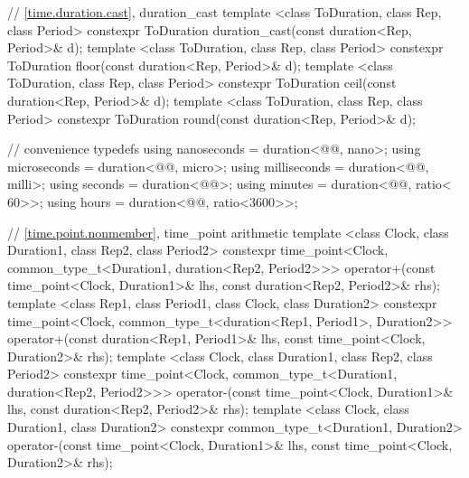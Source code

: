 \begin{codeblock}
{{    // \ref{time.duration.cast}, duration_cast
    template <class ToDuration, class Rep, class Period>
      constexpr ToDuration duration_cast(const duration<Rep, Period>& d);
    template <class ToDuration, class Rep, class Period>
      constexpr ToDuration floor(const duration<Rep, Period>& d);
    template <class ToDuration, class Rep, class Period>
      constexpr ToDuration ceil(const duration<Rep, Period>& d);
    template <class ToDuration, class Rep, class Period>
      constexpr ToDuration round(const duration<Rep, Period>& d);

    // convenience typedefs
    using nanoseconds  = duration<@@, nano>;
    using microseconds = duration<@@, micro>;
    using milliseconds = duration<@@, milli>;
    using seconds      = duration<@@>;
    using minutes      = duration<@@, ratio<  60>>;
    using hours        = duration<@@, ratio<3600>>;

    // \ref{time.point.nonmember}, time_point arithmetic
    template <class Clock, class Duration1, class Rep2, class Period2>
      constexpr time_point<Clock, common_type_t<Duration1, duration<Rep2, Period2>>>
      operator+(const time_point<Clock, Duration1>& lhs,
                const duration<Rep2, Period2>& rhs);
    template <class Rep1, class Period1, class Clock, class Duration2>
      constexpr time_point<Clock, common_type_t<duration<Rep1, Period1>, Duration2>>
      operator+(const duration<Rep1, Period1>& lhs,
                const time_point<Clock, Duration2>& rhs);
    template <class Clock, class Duration1, class Rep2, class Period2>
      constexpr time_point<Clock, common_type_t<Duration1, duration<Rep2, Period2>>>
      operator-(const time_point<Clock, Duration1>& lhs,
                const duration<Rep2, Period2>& rhs);
    template <class Clock, class Duration1, class Duration2>
      constexpr common_type_t<Duration1, Duration2>
      operator-(const time_point<Clock, Duration1>& lhs,
                const time_point<Clock, Duration2>& rhs);

}}
\end{codeblock}
